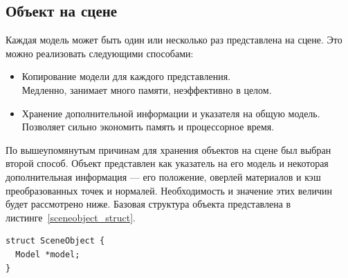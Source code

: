 \documentclass[a4paper,12pt]{report}
\numberwithin{equation}{section}
\begin{document}
\subsection{Объект на сцене}
Каждая модель может быть один или несколько раз представлена на сцене. Это можно реализовать следующими способами:
\begin{itemize}
\item Копирование модели для каждого представления. \\
Медленно, занимает много памяти, неэффективно в целом.
\item Хранение дополнительной информации и указателя на общую модель. \\
Позволяет сильно экономить память и процессорное время.
\end{itemize}
По вышеупомянутым причинам для хранения объектов на сцене был выбран второй способ. Объект представлен как указатель на его модель и некоторая дополнительная информация --- его положение, оверлей материалов и кэш преобразованных точек и нормалей. Необходимость и значение этих величин будет рассмотрено ниже. Базовая структура объекта представлена в листинге~\ref{sceneobject_struct}.

\begin{lstlisting}[float=h,caption={Структура данных ``Объект на сцене''},label=sceneobject_struct]
struct SceneObject {
  Model *model;
}
\end{lstlisting}
\end{document}
